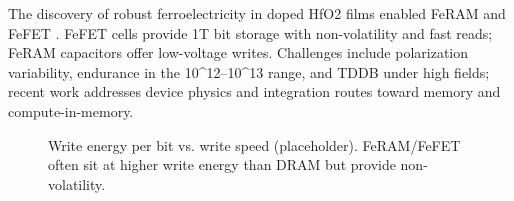 The discovery of robust ferroelectricity in doped HfO2 films enabled FeRAM and FeFET \cite{boscke2011,mueller2012}. FeFET cells provide 1T bit storage with non-volatility and fast reads; FeRAM capacitors offer low-voltage writes. Challenges include polarization variability, endurance in the 10^{12}–10^{13} range, and TDDB under high fields; recent work addresses device physics and integration routes toward memory and compute-in-memory.

\begin{figure}[!t]
  \centering
  \fbox{\rule{0pt}{1.10in}\rule{0.95\linewidth}{0pt}}
  \caption{Write energy per bit vs. write speed (placeholder). FeRAM/FeFET often sit at higher write energy than DRAM but provide non-volatility.}
  \label{fig:energy_speed}
\end{figure}
